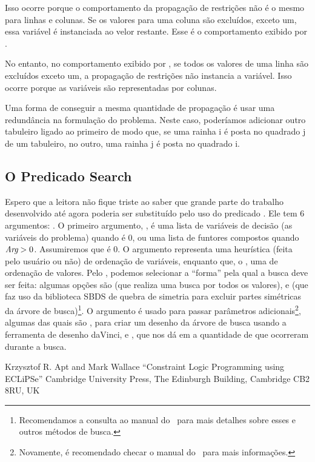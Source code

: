 \documentclass{article}
\begin{document}
Isso ocorre porque o comportamento da propagação de restrições não é o mesmo para linhas e colunas.
Se os valores para uma coluna são excluídos, exceto um, essa variável é instanciada ao velor
restante. Esse é o comportamento exibido por .

No entanto, no comportamento exibido por , se todos os valores de uma linha
são excluídos exceto um, a propagação de restrições não instancia a variável. Isso ocorre porque as
variáveis são representadas por colunas.

Uma forma de conseguir a mesma quantidade de propagação é usar uma redundância na formulação do
problema. Neste caso, poderíamos adicionar outro tabuleiro ligado ao primeiro de modo que, se uma
rainha i é posta no quadrado j de um tabuleiro, no outro, uma rainha j é posta no quadrado i.

\subsection{O Predicado Search}

Espero que a leitora não fique triste ao saber que grande parte do trabalho desenvolvido até agora
poderia ser substituído pelo uso do predicado . Ele tem 6 argumentos:
. O primeiro argumento,
, é uma lista de variáveis de decisão (as variáveis do problema) quando  é 0, ou
uma lista de funtores compostos quando $\textit{Arg} > 0$. Assumiremos que  é 0. O argumento 
representa uma heurística (feita pelo usuário ou não) de ordenação de variáveis, enquanto que, o
, uma de ordenação de valores. Pelo , podemos selecionar a ``forma'' pela
qual a busca deve ser feita: algumas opções são  (que realiza uma busca por
todos os valores), e  (que faz uso da biblioteca SBDS de quebra de simetria para
excluir partes simétricas da árvore de busca)\footnote{Recomendamos a consulta ao manual do \eclipse\
para mais detalhes sobre esses e outros métodos de busca.}. O argumento  é usado para
passar parâmetros adicionais\footnote{Novamente, é recomendado checar o manual do \eclipse\ para mais
informações.}, algumas das quais são \technical{node(daVinci)}, para criar um desenho da
árvore de busca usando a ferramenta de desenho daVinci, e \technical{backtracks(-N)}, que nos dá em
\var{N} a quantidade de \technical{backtrackings} que ocorreram durante a busca.




  \begin{thebibliography}{2}

    Krzysztof R. Apt and Mark Wallace
    ``Constraint Logic Programming using ECLiPSe''
    Cambridge University Press,
    The Edinburgh Building, Cambridge CB2 8RU, UK


  \end{thebibliography}
\end{document}
